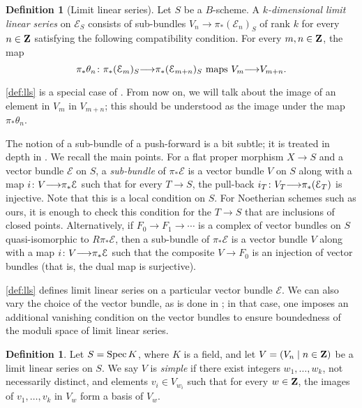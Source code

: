 \documentclass[11pt,reqno]{amsart}
\theoremstyle{plain}
\theoremstyle{definition}
\newtheorem{definition}[theorem]{Definition}
\theoremstyle{remark}
\numberwithin{equation}{section}
\renewcommand{\to}{{\longrightarrow}}
\numberwithin{equation}{section}
\begin{document}
\begin{definition}[Limit linear series]
  \label{def:lls}
  Let $S$ be a $B$-scheme.
  A \emph{$k$-dimensional limit linear series} on $\mathcal E_S$ consists of sub-bundles $V_n \to \pi_* (\mathcal E_n)_S$ of rank $k$ for every $n \in {\bf Z}$ satisfying the following compatibility condition.
  For every $m, n \in {\bf Z}$, the map
  \begin{equation}\label{lls:compatibility}
    \pi_* \theta_n \from \pi_* (\mathcal E_m)_S \to \pi_* (\mathcal E_{m+n})_S \text{ maps } V_m \to V_{m+n}.
  \end{equation}
\end{definition}
\autoref{def:lls} is a special case of \cite[Definition~3.3.2]{oss:14}.
From now on, we will talk about the image of an element in $V_m$ in $V_{m+n}$; this should be understood as the image under the map $\pi_* \theta_n$.

\begin{remark}
The notion of a sub-bundle of a push-forward is a bit subtle; it is treated in depth in \cite[Definition~B.2.1]{oss:14}.
We recall the main points.
For a flat proper morphism $X \to S$ and a vector bundle $\mathcal E$ on $S$, a \emph{sub-bundle} of $\pi_* \mathcal E$ is a vector bundle $V$ on $S$ along with a map $i \from V \to \pi_* \mathcal E$ such that for every $T \to S$, the pull-back $i_T \from V_T \to \pi_* (\mathcal E_T)$ is injective.
Note that this is a local condition on $S$.
For Noetherian schemes such as ours, it is enough to check this condition for the $T \to S$ that are inclusions of closed points.
Alternatively, if $F_0 \to F_1 \to \cdots $ is a complex of vector bundles on $S$ quasi-isomorphic to $R\pi_* \mathcal E$, then a sub-bundle of $\pi_* \mathcal E$ is a vector bundle $V$ along with a map $i \from V \to \pi_* \mathcal E$ such that the composite $V \to F_0$ is an injection of vector bundles (that is, the dual map is surjective).
\end{remark}


\begin{remark}
\autoref{def:lls} defines limit linear series on a particular vector bundle $\mathcal E$.
We can also vary the choice of the vector bundle, as is done in \cite{oss:14}; in that case, one imposes an additional vanishing condition on the vector bundles to ensure boundedness of the moduli space of limit linear series.
\end{remark}


\begin{definition}\label{def:simple_lls}
Let $S = \operatorname{Spec} K$, where $K$ is a field, and let $V = (V_n \mid n \in {\bf Z})$ be a limit linear series on $S$.
We say  $V$ is \emph{simple} if there exist integers $w_1, \dots, w_k$, not necessarily distinct, and elements $v_i \in V_{w_i}$ such that for every $w \in {\bf Z}$, the images of $v_1, \dots, v_k$ in $V_w$ form a basis of $V_w$.
\end{definition}
\end{document}
